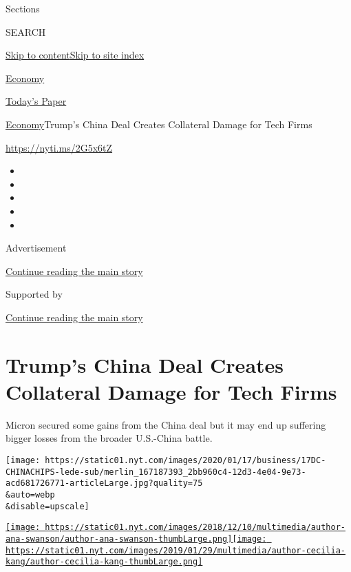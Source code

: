 Sections

SEARCH

\protect\hyperlink{site-content}{Skip to
content}\protect\hyperlink{site-index}{Skip to site index}

\href{https://www.nytimes.com/section/business/economy}{Economy}

\href{https://myaccount.nytimes.com/auth/login?response_type=cookie\&client_id=vi}{}

\href{https://www.nytimes.com/section/todayspaper}{Today's Paper}

\href{/section/business/economy}{Economy}\textbar{}Trump's China Deal
Creates Collateral Damage for Tech Firms

\url{https://nyti.ms/2G5x6tZ}

\begin{itemize}
\item
\item
\item
\item
\item
\end{itemize}

Advertisement

\protect\hyperlink{after-top}{Continue reading the main story}

Supported by

\protect\hyperlink{after-sponsor}{Continue reading the main story}

\hypertarget{trumps-china-deal-creates-collateral-damage-for-tech-firms}{%
\section{Trump's China Deal Creates Collateral Damage for Tech
Firms}\label{trumps-china-deal-creates-collateral-damage-for-tech-firms}}

Micron secured some gains from the China deal but it may end up
suffering bigger losses from the broader U.S.-China battle.

\texttt{[image: https://static01.nyt.com/images/2020/01/17/business/17DC-CHINACHIPS-lede-sub/merlin\_167187393\_2bb960c4-12d3-4e04-9e73-acd681726771-articleLarge.jpg?quality=75\\\&auto=webp\\\&disable=upscale]}

\href{https://www.nytimes.com/by/ana-swanson}{\texttt{[image: https://static01.nyt.com/images/2018/12/10/multimedia/author-ana-swanson/author-ana-swanson-thumbLarge.png]}}\href{https://www.nytimes.com/by/cecilia-kang}{\texttt{[image: https://static01.nyt.com/images/2019/01/29/multimedia/author-cecilia-kang/author-cecilia-kang-thumbLarge.png]}}

